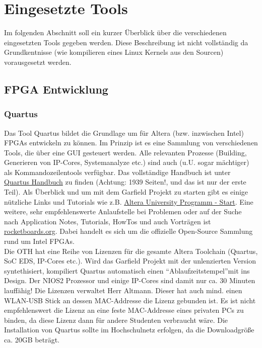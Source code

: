 \section{Eingesetzte Tools}
Im folgenden Abschnitt soll ein kurzer Überblick über die verschiedenen eingesetzten Tools gegeben werden. Diese Beschreibung ist nicht vollständig da Grundkentnisse (wie kompilieren eines Linux Kernels aus den Sourcen) vorausgesetzt werden.

\subsection{\ac{FPGA} Entwicklung}

\subsubsection{Quartus}
Das Tool Quartus bildet die Grundlage um für Altera (bzw. inzwischen Intel) \acp{FPGA} entwickeln zu können. Im Prinzip ist es eine Sammlung von verschiedenen Tools, die über eine GUI gesteuert werden. Alle relevanten Prozesse (Building, Generieren von IP-Cores, Systemanalyze etc.) sind auch (u.U. sogar mächtiger) als Kommandozeilentools verfügbar. Das vollständige Handbuch ist unter \href{https://www.altera.com/en_US/pdfs/literature/hb/qts/qts-qps-handbook.pdf}{Quartus Handbuch} zu finden (Achtung: 1939 Seiten!, und das ist nur der erste Teil). Als Überblick und um mit dem Garfield Projekt zu starten gibt es einige nützliche Links und Tutorials wie z.B. \href{https://www.altera.com/support/training/university/materials-tutorials.html}{Altera University Programm - Start}. Eine weitere, sehr empfehlenswerte Anlaufstelle bei Problemen oder auf der Suche nach Application Notes, Tutorials, HowTos und auch Vorträgen ist \href{rocketboards.org}{rocketboards.org}. Dabei handelt es sich um die offizielle Open-Source Sammlung rund um Intel \acp{FPGA}.\\

Die OTH hat eine Reihe von Lizenzen für die gesamte Altera Toolchain (Quartus, SoC EDS, IP-Cores etc.). Wird das Garfield Projekt mit der unlenzierten Version syntethisiert, kompiliert Quartus automatisch einen \textquotedblleft Ablaufzeitstempel\textquotedblright mit ins Design. Der NIOS2 Prozessor und einige \ac{IP}-Cores sind damit nur ca. 30 Minuten lauffähig! Die Lizenzen verwaltet Herr Altmann. Dieser hat auch mind. einen WLAN-USB Stick an dessen MAC-Addresse die Lizenz gebunden ist. Es ist nicht empfehlenswert die Lizenz an eine feste MAC-Addresse eines privaten PCs zu binden, da diese Lizenz dann für andere Studenten verbraucht wäre. Die Installation von Quartus sollte im Hochschulnetz erfolgen, da die Downloadgröße ca. 20GB beträgt.

